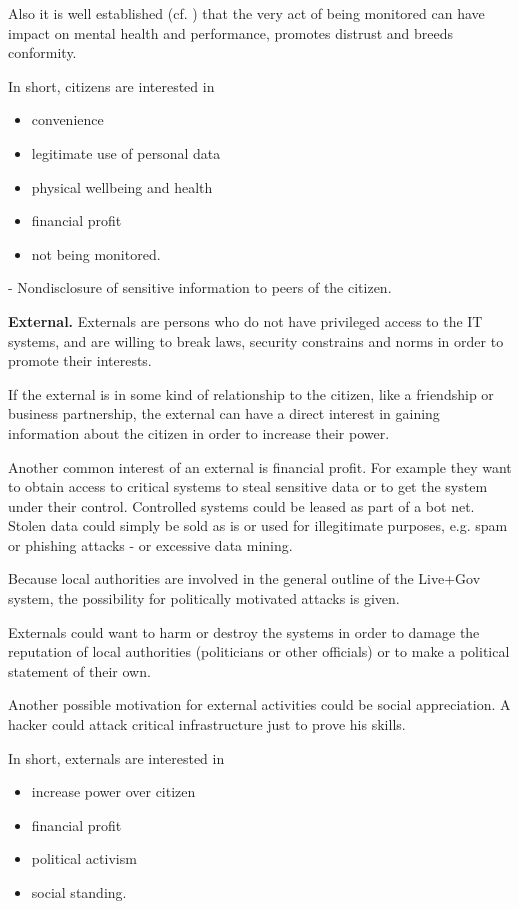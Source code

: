 Also it is well established (cf. \cite{GuardienMassSurveillance}) that the very act of being monitored can have impact on mental health and performance, promotes distrust and breeds conformity.

In short, citizens are interested in
\begin{itemize}
\item convenience
\item legitimate use of personal data
\item physical wellbeing and health
\item financial profit
\item not being monitored.
\end{itemize}

- Nondisclosure of sensitive information to peers of the citizen.

\textbf{External.}
Externals are persons who do not have privileged access to the IT systems, and are willing to break laws, security constrains and norms in order to promote their interests.

If the external is in some kind of relationship to the citizen, like a friendship or business partnership, the external can have a direct interest in gaining information about the citizen in order to increase their power.

Another common interest of an external is financial profit. For example they want to obtain access to critical systems to steal sensitive data or to get the system under their control.
Controlled systems could be leased as part of a bot net.
Stolen data could simply be sold as is or used for illegitimate purposes, e.g. spam or phishing attacks - or excessive data mining.

Because local authorities are involved in the general outline of the Live+Gov system, the possibility for politically motivated attacks is given.

Externals could want to harm or destroy the systems in order to damage the reputation of local authorities (politicians or other officials) or to make a political statement of their own.

Another possible motivation for external  activities could be social appreciation.
A hacker could attack critical infrastructure just to prove his skills.

In short, externals are interested in
\begin{itemize}
\item increase power over citizen
\item financial profit
\item political activism
\item social standing.
\end{itemize}

